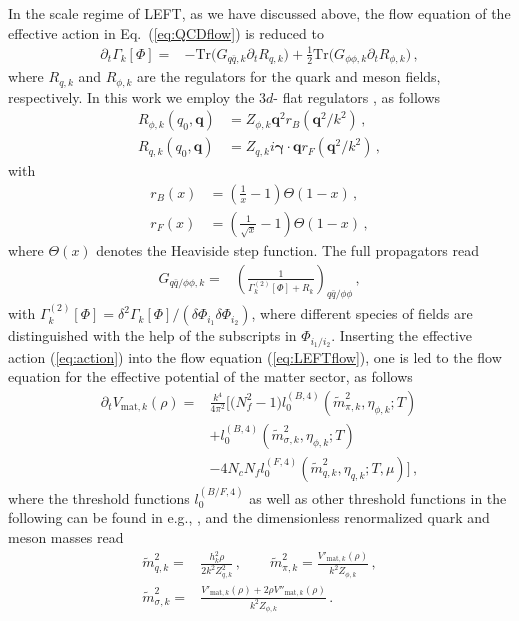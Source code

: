 \documentclass[%
reprint,
superscriptaddress,
showpacs,preprintnumbers,
 amsmath,amssymb,
 aps,
prd,
]{revtex4-1}
\def\Eq#1{Eq.~(\ref{#1})}
\def\eq#1{(\ref{#1})}
\begin{document}
In the scale regime of LEFT, as we have discussed above, the flow equation of the effective action in \Eq{eq:QCDflow} is reduced to 
%
\begin{align}
\partial_t\Gamma_k[\Phi]=&-\mathrm{Tr}\Big(G_{q\bar q,k}\partial_t R_{q,k}\Big)+\frac{1}{2}\mathrm{Tr}\Big(G_{\phi\phi,k}\partial_t R_{\phi,k}\Big)\,,\label{eq:LEFTflow}
\end{align}
%
where $R_{q,k}$ and $R_{\phi,k}$ are the regulators for the quark and meson fields, respectively. In this work we employ the $3d$- flat regulators \cite{Litim:2000ci, Litim:2001up, Litim:2006ag}, as follows
\begin{align}
  R_{\phi,k}(q_0,\bm{q})&=Z_{\phi,k}\bm{q}^2 r_B(\bm{q}^2/k^2)\,, \label{eq:Rphi}\\[2ex] 
  R_{q,k}(q_0,\bm{q})&=Z_{q,k}i\bm{\gamma} \cdot \bm{q} r_F(\bm{q}^2/k^2)\,, \label{eq:Rq}
\end{align} 
with 
\begin{align}
  r_B(x)&=\left( \frac{1}{x}-1 \right)\Theta(1-x)\,,\\[2ex] 
  r_F(x)&=\left( \frac{1}{\sqrt{x}}-1 \right)\Theta(1-x)\,,  \label{}
\end{align} 
where $\Theta(x)$ denotes the Heaviside step function. The full propagators read
%
\begin{align}
G_{q\bar q/\phi\phi,k}=&\left(\frac{1}{\Gamma^{(2)}_k[\Phi]+R_k}\right)_{q\bar q/\phi\phi}\,,\label{}
\end{align}
%
with $\Gamma^{(2)}_k[\Phi]=\delta^2\Gamma_k[\Phi]/(\delta \Phi_{i_1}\delta \Phi_{i_2})$, where different species of fields are distinguished with the help of the subscripts in $\Phi_{i_1/i_2}$. Inserting the effective action \eq{eq:action} into the flow equation \eq{eq:LEFTflow}, one is led to the flow equation for the effective potential of the matter sector, as follows
%
\begin{align}
  \partial_t V_{\mathrm{mat},k}(\rho)=&\frac{k^4}{4\pi^2} \bigg [\big(N^2_f-1\big) l^{(B,4)}_{0}(\tilde{m}^{2}_{\pi,k},\eta_{\phi,k};T)\nonumber\\[2ex]
&+l^{(B,4)}_{0}(\tilde{m}^{2}_{\sigma,k},\eta_{\phi,k};T)\nonumber\\[2ex]
&-4N_c N_f l^{(F,4)}_{0}(\tilde{m}^{2}_{q,k},\eta_{q,k};T,\mu)\bigg]\,, \label{eq:flowV}
\end{align}
%
where the threshold functions $l^{(B/F,4)}_{0}$ as well as other threshold functions in the following can be found in e.g., \cite{Fu:2019hdw,Yin:2019ebz}, and the dimensionless renormalized quark and meson masses read
%
\begin{align}
  \tilde{m}^{2}_{q,k}=&\frac{h^{2}_{k}\rho}{2k^2Z^{2}_{q,k}}\,, \qquad \tilde{m}^{2}_{\pi,k}=\frac{V'_{\mathrm{mat},k}(\rho)}{k^2 Z_{\phi,k}}\,, \\[2ex]
  \tilde{m}^{2}_{\sigma,k}=&\frac{V'_{\mathrm{mat},k}(\rho)+2\rho V''_{\mathrm{mat},k}(\rho)}{k^2 Z_{\phi,k}}\,.\label{}
\end{align}
%
\end{document}

